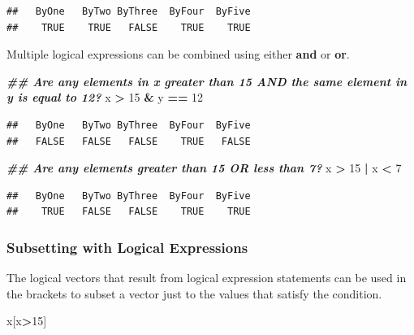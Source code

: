 \documentclass[
]{book}
\newenvironment{Shaded}{\begin{snugshade}}{\end{snugshade}}
\newcommand{\DecValTok}[1]{\textcolor[rgb]{0.00,0.00,0.81}{#1}}
\newcommand{\DocumentationTok}[1]{\textcolor[rgb]{0.56,0.35,0.01}{\textbf{\textit{#1}}}}
\newcommand{\NormalTok}[1]{#1}
\newcommand{\SpecialCharTok}[1]{\textcolor[rgb]{0.81,0.36,0.00}{\textbf{#1}}}
\theoremstyle{definition}
\theoremstyle{definition}
\theoremstyle{definition}
\theoremstyle{definition}
\theoremstyle{remark}
\begin{document}
\begin{verbatim}
##   ByOne   ByTwo ByThree  ByFour  ByFive 
##    TRUE    TRUE   FALSE    TRUE    TRUE
\end{verbatim}

Multiple logical expressions can be combined using either \textbf{and} or \textbf{or}.

\begin{Shaded}
\begin{Highlighting}[]
\DocumentationTok{\#\# Are any elements in x greater than 15 AND the same element in y is equal to 12?}
\NormalTok{x }\SpecialCharTok{\textgreater{}} \DecValTok{15} \SpecialCharTok{\&}\NormalTok{ y }\SpecialCharTok{==} \DecValTok{12}
\end{Highlighting}
\end{Shaded}

\begin{verbatim}
##   ByOne   ByTwo ByThree  ByFour  ByFive 
##   FALSE   FALSE   FALSE    TRUE   FALSE
\end{verbatim}

\begin{Shaded}
\begin{Highlighting}[]
\DocumentationTok{\#\# Are any elements greater than 15 OR less than 7?}
\NormalTok{x }\SpecialCharTok{\textgreater{}} \DecValTok{15} \SpecialCharTok{|}\NormalTok{ x }\SpecialCharTok{\textless{}} \DecValTok{7}
\end{Highlighting}
\end{Shaded}

\begin{verbatim}
##   ByOne   ByTwo ByThree  ByFour  ByFive 
##    TRUE   FALSE   FALSE    TRUE    TRUE
\end{verbatim}

\hypertarget{subsetting-with-logical-expressions-1}{%
\subsubsection{Subsetting with Logical Expressions}\label{subsetting-with-logical-expressions-1}}

The logical vectors that result from logical expression statements can be used in the brackets to subset a vector just to the values that satisfy the condition.

\begin{Shaded}
\begin{Highlighting}[]
\NormalTok{x[x}\SpecialCharTok{\textgreater{}}\DecValTok{15}\NormalTok{]}
\end{Highlighting}
\end{Shaded}
\end{document}
